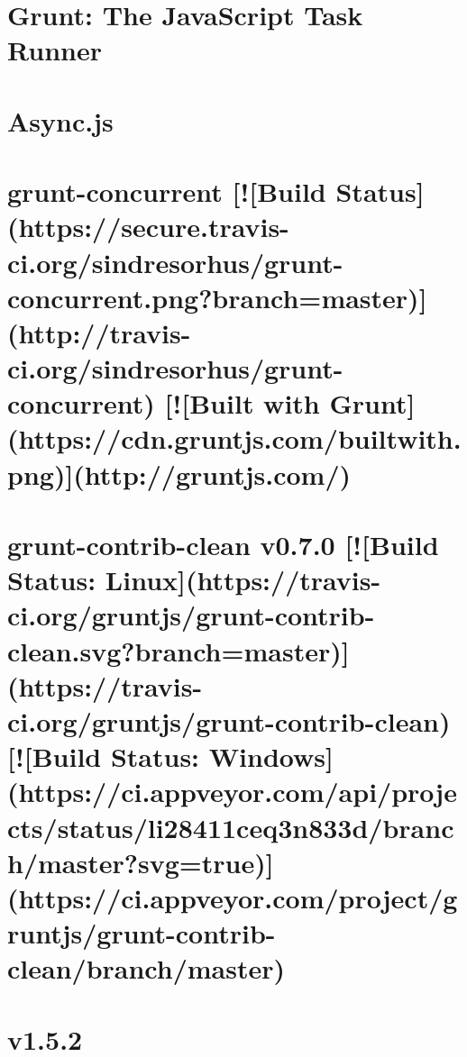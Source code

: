 \documentclass[twoside]{book}
\newcommand{\+}{\discretionary{\mbox{\scriptsize$\hookleftarrow$}}{}{}}
\begin{document}
\chapter{Grunt\+: The Java\+Script Task Runner}
\label{md_app_web_node_modules_grunt__r_e_a_d_m_e}

\chapter{Async.\+js}
\label{md_app_web_node_modules_grunt-concurrent_node_modules_async__r_e_a_d_m_e}

\chapter{grunt-\/concurrent \mbox{[}!\mbox{[}Build Status\mbox{]}(https\+://secure.travis-\/ci.org/sindresorhus/grunt-\/concurrent.png?branch=master)\mbox{]}(http\+://travis-\/ci.org/sindresorhus/grunt-\/concurrent) \mbox{[}!\mbox{[}Built with Grunt\mbox{]}(https\+://cdn.gruntjs.\+com/builtwith.png)\mbox{]}(http\+://gruntjs.com/)}
\label{md_app_web_node_modules_grunt-concurrent_readme}

\chapter{grunt-\/contrib-\/clean v0.7.0 \mbox{[}!\mbox{[}Build Status\+: Linux\mbox{]}(https\+://travis-\/ci.org/gruntjs/grunt-\/contrib-\/clean.svg?branch=master)\mbox{]}(https\+://travis-\/ci.org/gruntjs/grunt-\/contrib-\/clean) \mbox{[}!\mbox{[}Build Status\+: Windows\mbox{]}(https\+://ci.appveyor.\+com/api/projects/status/li28411ceq3n833d/branch/master?svg=true)\mbox{]}(https\+://ci.appveyor.\+com/project/gruntjs/grunt-\/contrib-\/clean/branch/master)}
\label{md_app_web_node_modules_grunt-contrib-clean__r_e_a_d_m_e}

\chapter{v1.5.2}
\label{md_app_web_node_modules_grunt-contrib-compass_node_modules_async__c_h_a_n_g_e_l_o_g}

\end{document}

